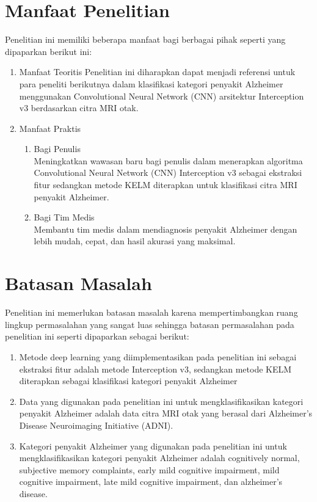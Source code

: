     \section{Manfaat Penelitian}
    Penelitian ini memiliki beberapa manfaat bagi berbagai pihak seperti yang dipaparkan berikut ini:
    \begin{enumerate}
        \item Manfaat Teoritis
        Penelitian ini diharapkan dapat menjadi referensi untuk para peneliti berikutnya dalam klasifikasi kategori penyakit Alzheimer menggunakan Convolutional Neural Network (CNN) arsitektur Interception v3 berdasarkan citra MRI otak.

        \item Manfaat Praktis
        \begin{enumerate}
            \item Bagi Penulis\\
            Meningkatkan wawasan baru bagi penulis dalam menerapkan algoritma Convolutional Neural Network (CNN) Interception v3 sebagai ekstraksi fitur sedangkan metode KELM diterapkan untuk klasifikasi citra MRI penyakit Alzheimer.

            \item Bagi Tim Medis\\
            Membantu tim medis dalam mendiagnosis penyakit Alzheimer dengan lebih mudah, cepat, dan hasil akurasi yang maksimal.
        \end{enumerate}
    \end{enumerate}

    \section{Batasan Masalah}
    Penelitian ini memerlukan batasan masalah karena mempertimbangkan ruang lingkup permasalahan yang sangat luas sehingga batasan permasalahan pada penelitian ini seperti dipaparkan sebagai berikut:
    \begin{enumerate}
        \item Metode deep learning yang diimplementasikan pada penelitian ini sebagai ekstraksi fitur adalah metode Interception v3, sedangkan metode KELM diterapkan sebagai klasifikasi kategori penyakit Alzheimer
        \item Data yang digunakan pada penelitian ini untuk mengklasifikasikan kategori penyakit Alzheimer adalah data citra MRI otak yang berasal dari Alzheimer's Disease Neuroimaging Initiative (ADNI).
        \item Kategori penyakit Alzheimer yang digunakan pada penelitian ini untuk mengklasifikasikan kategori penyakit Alzheimer adalah cognitively normal, subjective memory complaints, early mild cognitive impairment, mild cognitive impairment, late mild cognitive impairment, dan alzheimer's disease.
    \end{enumerate}

